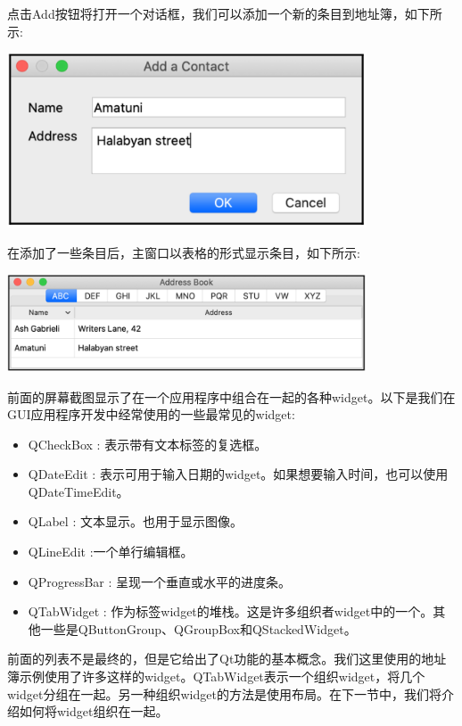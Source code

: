 点击Add按钮将打开一个对话框，我们可以添加一个新的条目到地址簿，如下所示: \par

\begin{center}
	\includegraphics[width=0.8\textwidth]{content/Section-2/Chapter-14/14}
\end{center}

在添加了一些条目后，主窗口以表格的形式显示条目，如下所示: \par

\begin{center}
	\includegraphics[width=0.8\textwidth]{content/Section-2/Chapter-14/15}
\end{center}

前面的屏幕截图显示了在一个应用程序中组合在一起的各种widget。以下是我们在GUI应用程序开发中经常使用的一些最常见的widget: \par

\begin{itemize}
	\item QCheckBox : 表示带有文本标签的复选框。
	\item QDateEdit : 表示可用于输入日期的widget。如果想要输入时间，也可以使用QDateTimeEdit。
	\item QLabel : 文本显示。也用于显示图像。
	\item QLineEdit :一个单行编辑框。
	\item QProgressBar : 呈现一个垂直或水平的进度条。
	\item QTabWidget : 作为标签widget的堆栈。这是许多组织者widget中的一个。其他一些是QButtonGroup、QGroupBox和QStackedWidget。
\end{itemize}

前面的列表不是最终的，但是它给出了Qt功能的基本概念。我们这里使用的地址簿示例使用了许多这样的widget。QTabWidget表示一个组织widget，将几个widget分组在一起。另一种组织widget的方法是使用布局。在下一节中，我们将介绍如何将widget组织在一起。 \par

